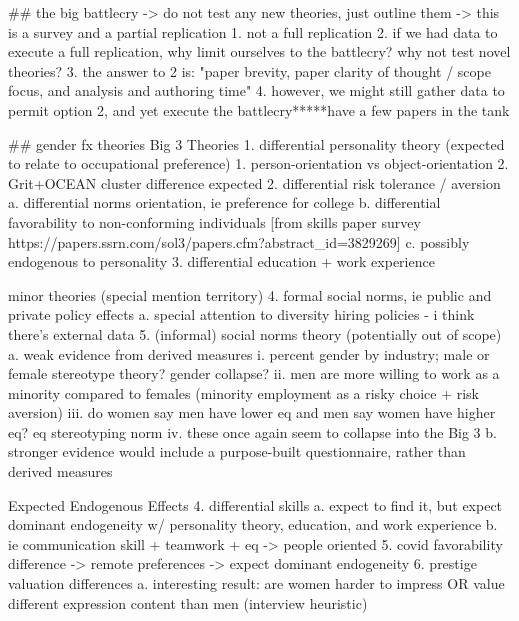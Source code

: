 \documentclass[review]{elsarticle}
\begin{document}



## the big battlecry
-> do not test any new theories, just outline them
-> this is a survey and a partial replication
    1. not a full replication
    2. if we had data to execute a full replication, why limit ourselves to the battlecry? why not test novel theories?
    3. the answer to 2 is: "paper brevity, paper clarity of thought / scope focus, and analysis and authoring time"
    4. however, we might still gather data to permit option 2, and yet execute the battlecry*****have a few papers in the tank

## gender fx theories
Big 3 Theories
1. differential personality theory (expected to relate to occupational preference)
    1. person-orientation vs object-orientation
    2. Grit+OCEAN cluster difference expected
2. differential risk tolerance / aversion
    a. differential norms orientation, ie preference for college
    b. differential favorability to non-conforming individuals [from skills paper survey https://papers.ssrn.com/sol3/papers.cfm?abstract_id=3829269]
    c. possibly endogenous to personality
3. differential education + work experience

minor theories (special mention territory)
4. formal social norms, ie public and private policy effects
    a. special attention to diversity hiring policies - i think there's external data
5. (informal) social norms theory (potentially out of scope)
    a. weak evidence from derived measures
        i. percent gender by industry; male or female stereotype theory? gender collapse?
        ii. men are more willing to work as a minority compared to females (minority employment as a risky choice + risk aversion)
        iii. do women say men have lower eq and men say women have higher eq? eq stereotyping norm
        iv. these once again seem to collapse into the Big 3
    b. stronger evidence would include a purpose-built questionnaire, rather than derived measures

Expected Endogenous Effects
4. differential skills
    a. expect to find it, but expect dominant endogeneity w/ personality theory, education, and work experience
    b. ie communication skill + teamwork + eq -> people oriented
5. covid favorability difference -> remote preferences -> expect dominant endogeneity
6. prestige valuation differences
    a. interesting result: are women harder to impress OR value different expression content than men (interview heuristic)
\end{document}
